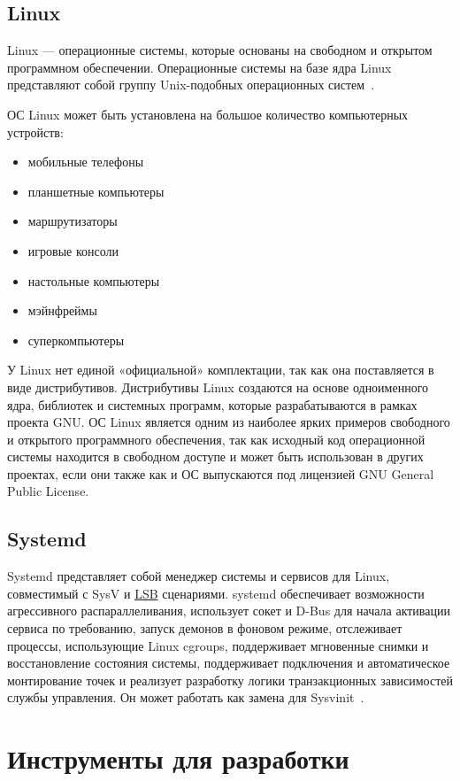 \subsection{Linux}
Linux –-- операционные системы, которые основаны на свободном и открытом
программном обеспечении. Операционные системы на базе ядра Linux представляют
собой группу Unix-подобных операционных систем~\cite{linux}.

ОС Linux может быть установлена на большое количество компьютерных устройств:
\begin{itemize}
    \item мобильные телефоны
    \item планшетные компьютеры
    \item маршрутизаторы
    \item игровые консоли
    \item настольные компьютеры
    \item мэйнфреймы
    \item суперкомпьютеры
\end{itemize}

У Linux нет единой «официальной» комплектации, так как она поставляется в виде
дистрибутивов. Дистрибутивы Linux создаются на основе одноименного ядра,
библиотек и системных программ, которые разрабатываются в рамках проекта GNU.
ОС Linux является одним из наиболее ярких примеров свободного и открытого
программного обеспечения, так как исходный код операционной системы находится в
свободном доступе и может быть использован в других проектах, если они также как
и ОС выпускаются под лицензией GNU General Public License.

\subsection{Systemd}
Systemd представляет собой менеджер системы и сервисов для Linux, совместимый с
SysV и \hyperlink{lsb}{LSB} сценариями. systemd обеспечивает возможности агрессивного
распараллеливания, использует сокет и D-Bus для начала активации сервиса по
требованию, запуск демонов в фоновом режиме, отслеживает процессы, использующие
Linux cgroups, поддерживает мгновенные снимки и восстановление состояния системы,
поддерживает подключения и автоматическое монтирование точек и реализует разработку
логики транзакционных зависимостей службы управления. Он может работать как
замена для Sysvinit~\cite{systemd}.

\section{Инструменты для разработки}

